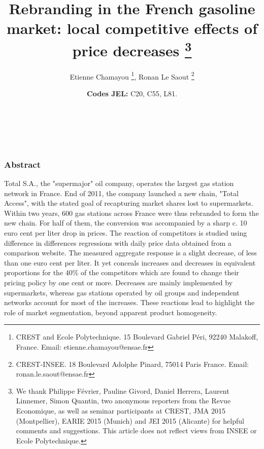 \documentclass[english]{article}
\begin{document}
\title{Rebranding in the French gasoline market: local competitive effects
of price decreases%
\thanks{We thank Philippe Février, Pauline Givord, Daniel Herrera, Laurent
Linnemer, Simon Quantin, two anonymous reporters from the Revue Economique,
as well as seminar participants at CREST, JMA 2015 (Montpellier), 
EARIE 2015 (Munich) and JEI 2015 (Alicante) for helpful comments and suggestions.
This article does not reflect views from INSEE or Ecole Polytechnique.%
}}


\author{Etienne Chamayou%
\thanks{CREST and Ecole Polytechnique. 15 Boulevard Gabriel Péri, 92240 Malakoff, France.
Email: etienne.chamayou@ensae.fr%
}, Ronan Le Saout%
\thanks{CREST-INSEE. 18 Boulevard Adolphe Pinard, 75014 Paris France. Email: ronan.le.saout@ensae.fr%
}}

\maketitle
\vspace{-1cm}
\ \\
\ \\
\subsubsection*{Abstract}

Total S.A., the "supermajor" oil company, operates the largest gas station network in France. End of 2011, the company launched a new chain, "Total Access", with the stated goal of recapturing market shares lost to supermarkets. Within two years, 600 gas stations across France were thus rebranded to form the new chain. For half of them, the conversion was accompanied by a sharp c. 10 euro cent per liter drop in prices. The reaction of competitors is studied using difference in differences regressions with daily price data obtained from a comparison website. The measured aggregate response is a slight decrease, of less than one euro cent per liter. It yet conceals increases and decreases in equivalent proportions for the 40\% of the competitors which are found to change their pricing policy by one cent or more. Decreases are mainly implemented by supermarkets, whereas gas stations operated by oil groups and independent networks account for most of the increases. These reactions lead to highlight the role of market segmentation, beyond apparent product homogeneity.

\medskip{}

\date{\noindent \textbf{Codes JEL:} C20, C55, L81.}
\end{document}
